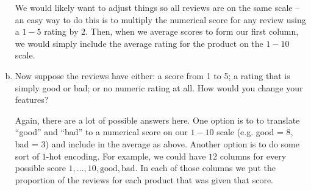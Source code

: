 \documentclass[10pt]{article}
\begin{document}
\begin{enumerate}[(a)]
		\color{blue}
	We would likely want to adjust things so all reviews are on the same scale -- an easy way to do this is to multiply the numerical score for any review using a $1-5$ rating by 2. Then, when we average scores  to form our  first column, we would simply include the average rating for the product on the $1-10$ scale.
	\color{black}
	
	\item Now suppose the reviews have either:  a score from 1 to 5;  a rating that is simply good or bad; or no numeric rating at all. How would you change your features?
		\color{blue}
		
	Again, there are a lot of possible answers here. One option is to to translate ``good'' and ``bad'' to a numerical score on our $1-10$ scale (e.g. good = 8, bad = 3) and include in the average as above.
	Another option is to do some sort of $1$-hot encoding. For example, we could have $12$ columns for every possible score $1,\ldots, 10, \text{good}, \text{bad}$. In each of those columns we put the proportion of the reviews for each product that was given that score.
		\color{black}
\end{enumerate}

\newpage
\end{document}
